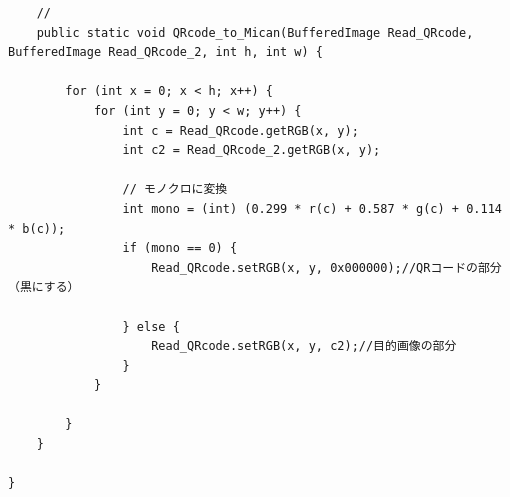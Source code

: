 \documentclass{thesis}
\begin{document}
\begin{lstlisting}
	//
	public static void QRcode_to_Mican(BufferedImage Read_QRcode, BufferedImage Read_QRcode_2, int h, int w) {

		for (int x = 0; x < h; x++) {
			for (int y = 0; y < w; y++) {
				int c = Read_QRcode.getRGB(x, y);
				int c2 = Read_QRcode_2.getRGB(x, y);

				// モノクロに変換
				int mono = (int) (0.299 * r(c) + 0.587 * g(c) + 0.114 * b(c));
				if (mono == 0) {
					Read_QRcode.setRGB(x, y, 0x000000);//QRコードの部分（黒にする）

				} else {
					Read_QRcode.setRGB(x, y, c2);//目的画像の部分
				}
			}

		}
	}
	
}
\end{lstlisting}

\newpage
\end{document}

